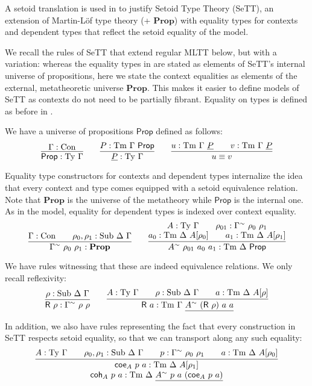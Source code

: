 \documentclass[autoref]{llncs}
\newcommand{\GG}{\Gamma}
\newcommand{\DD}{\Delta}
\newcommand{\GD}{\Delta}
\newcommand{\coe}{\textsf{coe}}
\newcommand{\coh}{\textsf{coh}}
\newcommand{\tyj}[2]{#2 : \Ty\ #1}
\newcommand{\tmj}[3]{#2 : \Tm\ #1\ #3}
\newcommand{\subj}[3]{#1 : \mathrm{Sub}\ #2\ #3}
\newcommand{\Prop}{\textsf{Prop}}
\newcommand{\mProp}{\mathbf{Prop}}
\newcommand{\Con}{\mathrm{Con}}
\newcommand{\Ty}{\mathrm{Ty}}
\newcommand{\Tm}{\mathrm{Tm}}
\newcommand{\Sub}{\mathrm{Sub}}
\begin{document}
A setoid translation is used in \cite{mpc19} to justify Setoid Type Theory
(SeTT), an extension of Martin-L\"of type theory (+ $\mProp$) with equality
types for contexts and dependent types that reflect the setoid equality of the
model.

We recall the rules of SeTT that extend regular MLTT below, but with a
variation: whereas the equality types in \cite{mpc19} are stated as elements of
SeTT's internal universe of propositions, here we state the context equalities
as elements of the external, metatheoretic universe $\mProp$. This makes it easier
to define models of SeTT as contexts do not need to be partially fibrant. Equality on
types is defined as before in \cite{mpc19}.

We have a universe of propositions $\Prop$ defined as follows:
\[
\infer{
  \Prop : \Ty\ \GG
}{
  \GG : \Con
}
\qquad
\infer{
  \underline{P} : \Ty\ \GG
}{
  P : \Tm\ \GG\ \Prop
}
\qquad
\infer{
  u \equiv v\vphantom{\Prop}
}{
  u : \Tm\ \GG\ \underline{P} && v : \Tm\ \GG\ \underline{P}
}
\]

Equality type constructors for contexts and dependent types internalize the idea
that every context and type comes equipped with a setoid equivalence
relation. Note that $\mProp$ is the universe of the metatheory while $\Prop$ is
the internal one. As in the model, equality for dependent types is indexed over context
equality.
\[
\infer{
  \GG^\sim\ \rho_0\ \rho_1 : \mProp
}{
  \GG : \Con \qquad \subj{\rho_0, \rho_1}{\DD}{\GG}
}
\qquad
\infer{
  A^{\sim}\ \rho_{01}\ a_0\ a_1 : \Tm\ \DD\ \Prop
}{
  \deduce{
    a_0 : \Tm\ \DD\ A[\rho_0] \qquad a_1 : \Tm\ \DD\ A[\rho_1]
  }{
    A : \Ty\ \GG \qquad \rho_{01} : \GG^{\sim}\ \rho_0\ \rho_1
  }
}
\]

We have rules witnessing that these are indeed equivalence relations. We only
recall reflexivity:
\[
\infer{
  \textsf{R}\ \rho : \GG^\sim\ \rho\ \rho
}{
  \rho : \Sub\ \GD\ \GG
}
\qquad
\infer{
  \textsf{R}\ a : \Tm\ \GG\ \underline{A^\sim\ (\textsf{R}\ \rho)\ a\ a}
}{
  A : \Ty\ \GG
  \qquad
  \rho : \Sub\ \GD\ \GG
  \qquad
  a : \Tm\ \GD\ A[\rho]
}
\]

In addition, we also have rules representing the fact that every construction in
SeTT respects setoid equality, so that we can transport along any such equality:
    \[
    \infer{
      \deduce{
        \tmj{\GD}{\coh_A\ p\ a}{\underline{A^\sim\ p\ a\ (\coe_A\ p\ a)}}
      }{
        \tmj{\GD}{\coe_A\ p\ a}{A[\rho_1]}
      }
    }{
      \tyj{\GG}{A} \qquad \subj{\rho_0, \rho_1}{\GD}{\GG} \qquad
      p : \GG^\sim\ \rho_0\ \rho_1\qquad
      \tmj{\GD}{a}{A[\rho_0]}
    }
    \]
\end{document}
